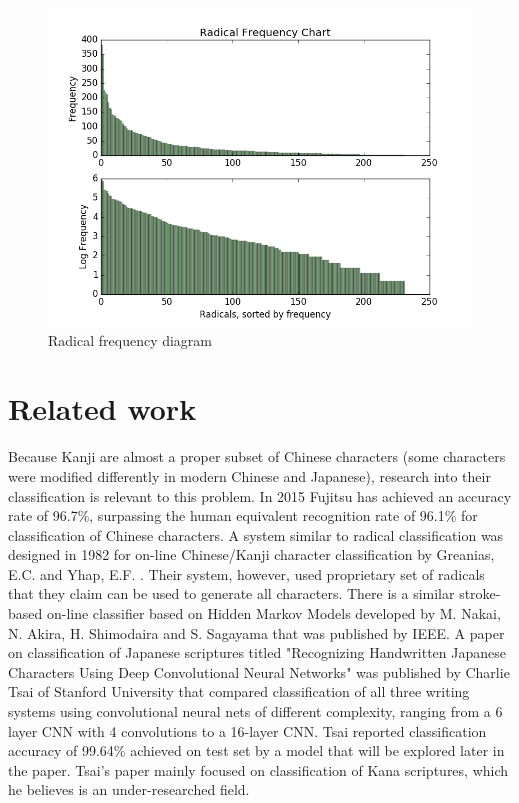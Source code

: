 \documentclass{article}
\begin{document}
\begin{CJK*}{UTF8}{min}
\begin{figure}[h]
    \centering
    \includegraphics[width=\textwidth]{radicals_zipf}
    \caption{Radical frequency diagram}
    \label{fig:zipf}
\end{figure}

\section{Related work}
Because Kanji are almost a proper subset of Chinese characters (some characters were modified differently in modern Chinese and Japanese), research into their classification is relevant to this problem. In 2015 Fujitsu has achieved an accuracy rate of 96.7\%, surpassing the human equivalent recognition rate of 96.1\% for classification of Chinese characters\cite{fuji}. A system similar to radical classification was designed in 1982 for on-line Chinese/Kanji character classification by Greanias, E.C. and Yhap, E.F. \cite{greanias1982chinese}. Their system, however, used proprietary set of radicals that they claim can be used to generate all characters. There is a similar stroke-based on-line classifier based on Hidden Markov Models developed by M. Nakai, N. Akira, H. Shimodaira and S. Sagayama that was published by IEEE\cite{953838}. A paper on classification of Japanese scriptures titled "Recognizing Handwritten Japanese Characters Using Deep Convolutional Neural Networks" was published by Charlie Tsai of Stanford University \cite{tsai} that compared classification of all three writing systems using convolutional neural nets of different complexity, ranging from a 6 layer CNN with 4 convolutions to a 16-layer CNN. Tsai reported classification accuracy of 99.64\% achieved on test set by a model that will be explored later in the paper. Tsai's paper mainly focused on classification of Kana scriptures, which he believes is an under-researched field.


\end{CJK*}
\end{document}
